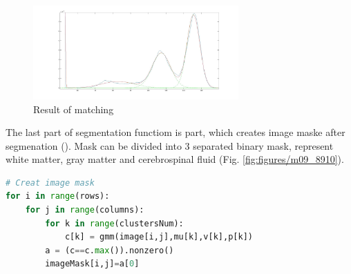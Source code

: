 \begin{figure}[H]
	\centering{}\includegraphics[width=0.7\textwidth]{figures/Module_09/m09_15}
	\caption{Result of matching  
	\label{fig:figures/m09_15}}
\end{figure} 

The last part of segmentation functiom is part, which creates image maske after segmenation (). Mask can be divided into 3 separated binary mask, represent white matter, gray matter and cerebrospinal fluid (Fig. \ref{fig:figures/m09_8910}).

\begin{lstlisting}[language=Python, caption = Create image mask]
# Creat image mask        
for i in range(rows):
	for j in range(columns):
    	for k in range(clustersNum):
        	c[k] = gmm(image[i,j],mu[k],v[k],p[k])
        a = (c==c.max()).nonzero()
        imageMask[i,j]=a[0]
\end{lstlisting}

